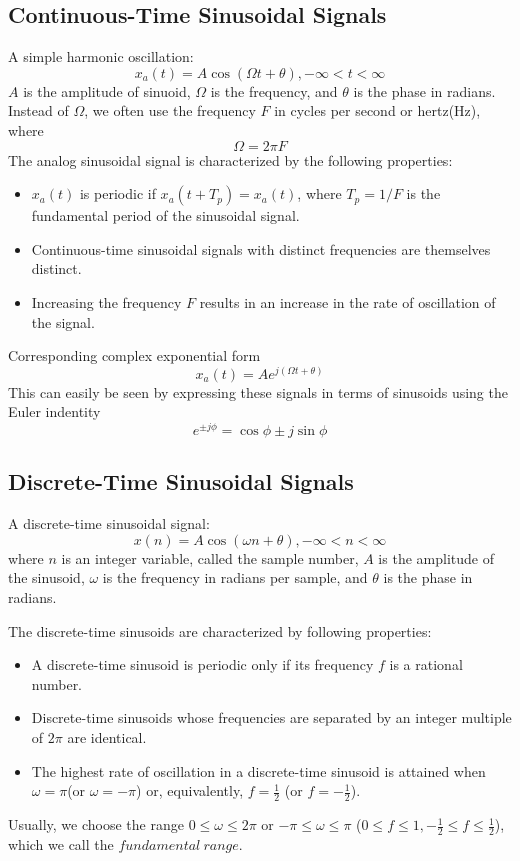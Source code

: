 \documentclass[10pt,a4paper,oneside]{article}
\begin{document}
\subsection{Continuous-Time Sinusoidal Signals}
A simple harmonic oscillation:
\[
x_a(t) = A\cos(\Omega t+\theta), -\infty<t<\infty
\]
$A$ is the amplitude of sinuoid, $\Omega$ is the frequency, and $\theta$ is the phase in radians. Instead of $\Omega$, we often use the frequency $F$ in cycles per second or hertz(Hz), where
\[
\Omega = 2\pi F
\]
The analog sinusoidal signal is characterized by the following properties:
\begin{itemize}
\item  $x_a(t)$ is periodic if 
$
x_a(t+T_p)=x_a(t)
$, 
where $T_p=1/F$ is the fundamental period of the sinusoidal signal.
\item Continuous-time sinusoidal signals with distinct frequencies are themselves distinct.
\item Increasing the frequency $F$ results in an increase in the rate of oscillation of the signal.
\end{itemize}
Corresponding complex exponential form
\[
x_a(t) = Ae^{j(\Omega t+\theta)}
\]
This can easily be seen by expressing these signals in terms of sinusoids using the Euler indentity
\[
e^{\pm j\phi}=\cos \phi\pm j\sin \phi
\]
\subsection{Discrete-Time Sinusoidal Signals}
A discrete-time sinusoidal signal:
\[
x(n)=A\cos (\omega n+\theta), -\infty<n<\infty
\]
where $n$ is an integer variable, called the sample number, $A$ is the amplitude of the sinusoid, $\omega$ is the frequency in radians per sample, and $\theta$ is the phase in radians.

The discrete-time sinusoids are characterized by following properties:
\begin{itemize}
	\item  A discrete-time sinusoid is periodic only if its frequency $f$ is a rational number.
	\item Discrete-time sinusoids whose frequencies are separated by an integer multiple of $2\pi$ are identical.
	\item The highest rate of oscillation in a discrete-time sinusoid is attained when $\omega=\pi$(or $\omega=-\pi$) or, equivalently, $f=\frac{1}{2}$ (or $f=-\frac{1}{2}$).
\end{itemize}
Usually, we choose the range $0\leqslant\omega\leqslant2\pi$ or $-\pi\leqslant\omega\leqslant\pi$ ($0\leqslant f\leqslant1, -\frac{1}{2}\leqslant f\leqslant\frac{1}{2}$), which we call the $fundamental\ range$.
\end{document}
